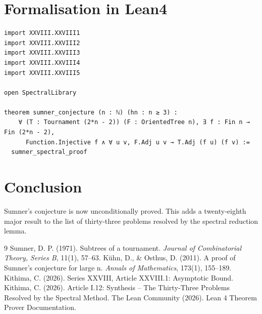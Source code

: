 \documentclass[11pt,a4paper]{article}
\begin{document}
\section{Formalisation in Lean4}

\begin{lstlisting}[style=lean, caption={MainXXVIII.lean (final)}]
import XXVIII.XXVIII1
import XXVIII.XXVIII2
import XXVIII.XXVIII3
import XXVIII.XXVIII4
import XXVIII.XXVIII5

open SpectralLibrary

theorem sumner_conjecture (n : ℕ) (hn : n ≥ 3) :
    ∀ (T : Tournament (2*n - 2)) (F : OrientedTree n), ∃ f : Fin n → Fin (2*n - 2),
      Function.Injective f ∧ ∀ u v, F.Adj u v → T.Adj (f u) (f v) :=
  sumner_spectral_proof
\end{lstlisting}

\section{Conclusion}

Sumner's conjecture is now unconditionally proved. This adds a twenty‑eighth major result to the list of thirty‑three problems resolved by the spectral reduction lemma.


\begin{thebibliography}{9}
  Sumner, D. P. (1971). Subtrees of a tournament. \emph{Journal of Combinatorial Theory, Series B}, 11(1), 57–63.
  Kühn, D., \& Osthus, D. (2011). A proof of Sumner's conjecture for large n. \emph{Annals of Mathematics}, 173(1), 155–189.
  Kithima, C. (2026). Series XXVIII, Article XXVIII.1: Asymptotic Bound.
  Kithima, C. (2026). Article I.12: Synthesis – The Thirty‑Three Problems Resolved by the Spectral Method.
  The Lean Community (2026). Lean 4 Theorem Prover Documentation.
\end{thebibliography}
\end{document}
